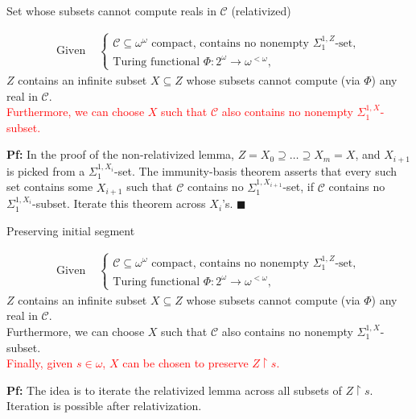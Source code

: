 \begin{frame}{Set whose subsets cannot compute reals in $\mathcal{C}$
(relativized)}
  \begin{main-lemma*}[\textcolor{red}{Relativized}]
    \begin{align*}
      \text{Given } &\begin{cases}
        \mathcal{C}\subseteq\omega^\omega \text{ compact, contains
        no nonempty } \Sigma^{1,Z}_1\text{-set},\\
        \text{Turing functional } \Phi:2^{\omega}\rightarrow
        \omega^{<\omega},
      \end{cases}
    \end{align*}
    $Z$ contains an infinite subset $X\subseteq Z$ whose subsets cannot
    compute (via $\Phi$) any real in $\mathcal{C}$.\\
    \vspace{0.5em}
    \textcolor{red}{Furthermore, we can choose $X$ such that $\mathcal{C}$
    also contains no nonempty $\Sigma_1^{1,X}$-subset.}
  \end{main-lemma*}

  \textbf{Pf:} In the proof of the non-relativized lemma, $Z=X_0
  \supseteq \ldots\supseteq X_m=X$, and $X_{i+1}$ is picked from a
  $\Sigma^{1,X_i}_1$-set. The immunity-basis theorem asserts
  that every such set contains some $X_{i+1}$ such that $\mathcal{C}$
  contains no $\Sigma_1^{1,X_{i+1}}$-set, if $\mathcal{C}$ contains no
  $\Sigma^{1,X_i}_1$-subset. Iterate this theorem across $X_i$'s.
  $\blacksquare$
\end{frame}

\begin{frame}{Preserving initial segment}
  \begin{main-lemma*}
    \begin{align*}
      \text{Given } &\begin{cases}
        \mathcal{C}\subseteq\omega^\omega \text{ compact, contains
        no nonempty } \Sigma^{1,Z}_1\text{-set},\\
        \text{Turing functional } \Phi:2^{\omega}\rightarrow
        \omega^{<\omega},
      \end{cases}
    \end{align*}
    $Z$ contains an infinite subset $X\subseteq Z$ whose subsets cannot
    compute (via $\Phi$) any real in $\mathcal{C}$.\\
    \vspace{0.5em}
    Furthermore, we can choose $X$ such that $\mathcal{C}$ also contains no
    nonempty $\Sigma_1^{1,X}$-subset.\\
    \vspace{0.5em}
    \textcolor{red}{Finally, given $s\in\omega$, $X$ can be chosen to
    preserve $Z\restriction s$.}
  \end{main-lemma*}

  \vspace{1em}
  \textbf{Pf:} The idea is to iterate the relativized lemma across all
  subsets of $Z\restriction s$. Iteration is possible after relativization.
\end{frame}

